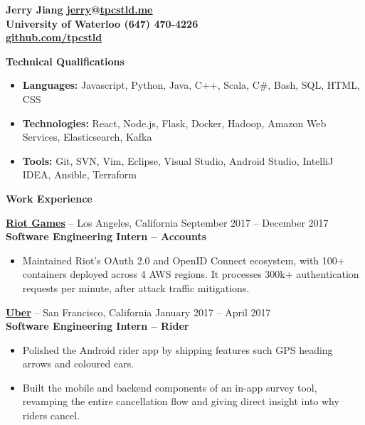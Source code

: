 \documentclass{letter}
\begin{document}
  \thispagestyle{empty}


{\bfseries
  {\Large Jerry Jiang} \hfill \href{mailto:jerry@tpcstld.me}{\uline{jerry}}@\href{http://tpcstld.me}{\uline{tpcstld.me}} \\
  University of Waterloo \hfill (647) 470-4226 \\
\null \hfill \href{https://github.com/tpcstld}{\uline{github.com/tpcstld}}}

{\bfseries \Large Technical Qualifications}

\vspace{-10mm}
\null\hrulefill

\vspace{-3mm}
\begin{itemize}
    \item {\bfseries Languages:}
        Javascript, Python, Java, C++, Scala, C\#, Bash, SQL, HTML, CSS
    \item {\bfseries Technologies:}
        React, Node.js, Flask, Docker, Hadoop, Amazon Web Services,
        Elasticsearch, Kafka
    \item {\bfseries Tools:}
        Git, SVN, Vim, Eclipse, Visual Studio, Android Studio, IntelliJ IDEA,
        Ansible, Terraform
\end{itemize}

{\bfseries \Large Work Experience}

\vspace{-10mm}
\null\hrulefill

\vspace{-1.5mm}
{\bfseries \href{http://riotgames.com}{\uline{Riot Games}}} -- Los Angeles,
California \hfill September 2017 -- December 2017\\
{\bfseries Software Engineering Intern -- Accounts}
\vspace{-3mm}
\begin{itemize}
    \item Maintained Riot's OAuth 2.0 and OpenID Connect ecosystem, with 100+
      containers deployed across 4 AWS regions. It processes 300k+
      authentication requests per minute, after attack traffic mitigations.
\end{itemize}

\vspace{-1.5mm}
{\bfseries \href{http://uber.com}{\uline{Uber}}} -- San Francisco,
California \hfill January 2017 -- April 2017\\
{\bfseries Software Engineering Intern -- Rider}
\vspace{-3mm}
\begin{itemize}
    \item Polished the Android rider app by shipping features such
      GPS heading arrows and coloured cars.
    \item Built the mobile and backend components of an in-app survey tool,
      revamping the entire cancellation flow and giving direct insight into
      why riders cancel.
\end{itemize}
\end{document}
